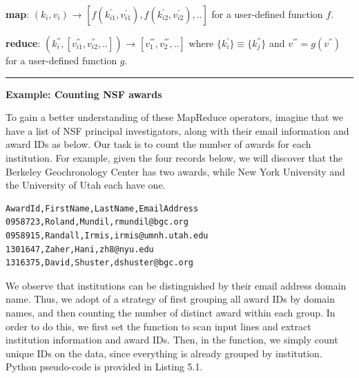 \documentclass[]{krantz}
\begin{document}
\textbf{map}: \((k_i, v_i)\) →
\([f(k^{'}_{i1}, v^{'}_{i1}),f(k^{'}_{i2}, v^{'}_{i2}),..]\) for a
user-defined function \(f\).

\textbf{reduce}: \((k^{''}_{i}, [v^{''}_{i1},v^{''}_{i2},..])\) →
\([v^{'''}_{1},v^{'''}_{2},..]\) where
\(\{k^{'}_{i}\} \equiv \{k^{''}_{j}\}\) and \(v^{'''} = g(v^{''})\) for
a user-defined function \(g\).

\enlargethispage{12pt}

\begin{center}\rule{0.5\linewidth}{\linethickness}\end{center}

\textbf{Example: Counting NSF awards}

To gain a better understanding of these MapReduce operators, imagine
that we have a list of NSF principal investigators, along with their
email information and award IDs as below. Our task is to count the
number of awards for each institution. For example, given the four
records below, we will discover that the Berkeley Geochronology Center
has two awards, while New York University and the University of Utah
each have one.

\begin{verbatim}
AwardId,FirstName,LastName,EmailAddress
0958723,Roland,Mundil,rmundil@bgc.org
0958915,Randall,Irmis,irmis@umnh.utah.edu
1301647,Zaher,Hani,zh8@nyu.edu
1316375,David,Shuster,dshuster@bgc.org
\end{verbatim}

We observe that institutions can be distinguished by their email address
domain name. Thus, we adopt of a strategy of first grouping all award
IDs by domain names, and then counting the number of distinct award
within each group. In order to do this, we first set the function to
scan input lines and extract institution information and award IDs.
Then, in the function, we simply count unique IDs on the data, since
everything is already grouped by institution. Python pseudo-code is
provided in Listing 5.1.
\end{document}
